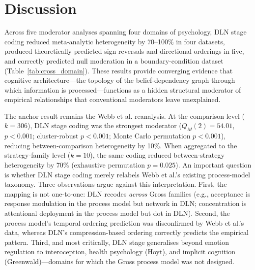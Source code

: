 \documentclass[11pt]{article}
\begin{document}
\section{Discussion}

Across five moderator analyses spanning four domains of psychology,
DLN stage coding reduced meta-analytic heterogeneity by 70--100\% in
four datasets, produced theoretically predicted sign reversals and
directional orderings in five, and correctly predicted null moderation
in a boundary-condition dataset (Table~\ref{tab:cross_domain}). These
results provide converging evidence that cognitive architecture---the
topology of the belief-dependency graph through which information is
processed---functions as a hidden structural moderator of empirical
relationships that conventional moderators leave unexplained.

The anchor result remains the Webb et al.\cite{Webb2012} reanalysis.
At the comparison level ($k = 306$), DLN stage coding was the
strongest moderator ($Q_M(2) = 54.01$, $p < 0.001$; cluster-robust
$p < 0.001$; Monte Carlo permutation $p < 0.001$), reducing
between-comparison heterogeneity by 10\%. When aggregated to the
strategy-family level ($k = 10$), the same coding reduced
between-strategy heterogeneity by 70\% (exhaustive permutation
$p = 0.025$). An important question is whether DLN stage
coding merely relabels Webb et al.'s existing process-model
taxonomy\cite{Gross2002}. Three observations argue against this
interpretation. First, the mapping is not one-to-one: DLN recodes
\textit{across} Gross families (e.g., acceptance is response modulation
in the process model but network in DLN; concentration is attentional
deployment in the process model but dot in DLN). Second, the process
model's temporal ordering prediction was disconfirmed by Webb et al.'s
data, whereas DLN's compression-based ordering correctly predicts the
empirical pattern. Third, and most critically, DLN stage generalises
beyond emotion regulation to interoception, health psychology (Hoyt),
and implicit cognition (Greenwald)---domains for which the Gross
process model was not designed.
\end{document}
